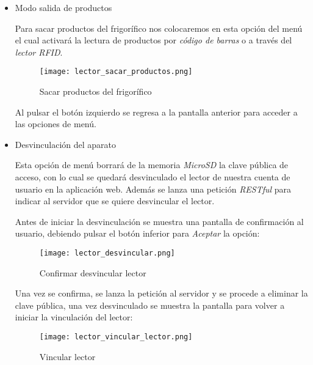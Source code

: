 \begin{itemize}
    \item Modo salida de productos

        Para sacar productos del frigorífico nos colocaremos en esta opción del menú el cual activará la lectura de productos por \emph{código de barras} o a través del \emph{lector RFID}.

        \begin{figure}[h!]
            \centering
            \texttt{[image: lector\_sacar\_productos.png]}
            \caption{Sacar productos del frigorífico}\label{fig:lector_sacar_productos}
        \end{figure}

        Al pulsar el botón izquierdo se regresa a la pantalla anterior para acceder a las opciones de menú.

    \item Desvinculación del aparato

        Esta opción de menú borrará de la memoria \emph{MicroSD} la clave pública de acceso, con lo cual se quedará desvinculado el lector de nuestra cuenta de usuario en la aplicación web. Además se lanza una petición \emph{RESTful} para indicar al servidor que se quiere desvincular el lector.

        Antes de iniciar la desvinculación se muestra una pantalla de confirmación al usuario, debiendo pulsar el botón inferior para \emph{Aceptar} la opción:

        \begin{figure}[h!]
            \centering
            \texttt{[image: lector\_desvincular.png]}
            \caption{Confirmar desvincular lector}\label{fig:lector_desvincular}
        \end{figure}

        Una vez se confirma, se lanza la petición al servidor y se procede a eliminar la clave pública, una vez desvinculado se muestra la pantalla para volver a iniciar la vinculación del lector:

        \begin{figure}[h!]
            \centering
            \texttt{[image: lector\_vincular\_lector.png]}
            \caption{Vincular lector}\label{fig:lector_vincular_lector}
        \end{figure}

\end{itemize}